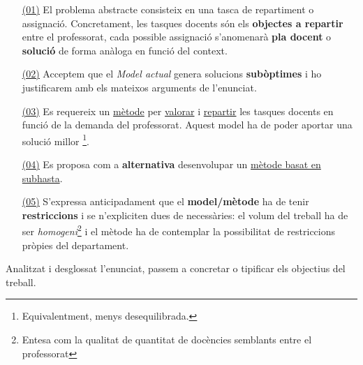 \documentclass[10pt,twocolumn]{article}
\begin{document}
\begin{itemize}
\item[{ \color{cyan!60} \underline{\underline{\normalcolor (01)}}}] El problema abstracte consisteix en una tasca de repartiment o assignació. Concretament, les tasques docents són els \textbf{objectes a repartir} entre  el professorat, cada possible assignació s'anomenarà \textbf{pla docent} o \textbf{solució} de forma anàloga en funció del context.\\
\item[{ \color{blue!60} \underline{\underline{\normalcolor (02)}}}] Acceptem que el \textit{Model actual} genera solucions \textbf{subòptimes} i ho  justificarem amb els mateixos arguments de l'enunciat.\\
\item[{ \color{green!60} \underline{\underline{\normalcolor (03)}}}] Es requereix un { \color{green!60} \underline{\normalcolor mètode}} per { \color{green!60} \underline{\normalcolor valorar}} i { \color{green!60} \underline{\normalcolor repartir}} les tasques docents en funció de la demanda del professorat. Aquest model ha de poder aportar una solució millor \footnote{Equivalentment, menys desequilibrada.}. 
\item[{ \color{purple!60} \underline{\underline{\normalcolor (04)}}}] Es proposa com a \textbf{alternativa}  desenvolupar un  { \color{purple!60} \underline{\normalcolor mètode basat en subhasta}}.
\item[{ \color{violet!60} \underline{\underline{\normalcolor (05)}}}] S'expressa anticipadament que el \textbf{model/mètode} ha de tenir \textbf{restriccions}  i se n'expliciten dues de necessàries: el volum del treball ha de ser \textit{homogeni}\footnote{Entesa com la qualitat de quantitat de docències semblants entre el professorat} i el mètode ha de contemplar la possibilitat de restriccions pròpies del departament. 
\end{itemize}
Analitzat i desglossat l'enunciat, passem a concretar o tipificar els objectius del treball.
\end{document}
